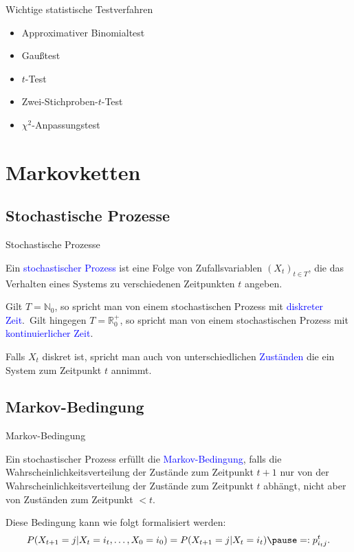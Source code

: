 \documentclass{beamer}
\def\spadding{\vspace{0.25cm}}
\def\b{\textcolor{blue}}
\begin{document}
\begin{frame}
    \begin{block}{Wichtige statistische Testverfahren}\pause
        \begin{itemize}
            \item Approximativer Binomialtest\pause
            \item Gaußtest\pause
            \item $t$-Test\pause
            \item Zwei-Stichproben-$t$-Test\pause
            \item $\chi^2$-Anpassungstest
        \end{itemize}
    \end{block}
\end{frame}

\section{Markovketten}
\subsection{Stochastische Prozesse}
\begin{frame}{Stochastische Prozesse}
    \begin{definition}
        Ein \b{stochastischer Prozess} ist eine Folge von Zufallsvariablen $(X_t)_{t \in T}$, die das Verhalten eines Systems zu verschiedenen Zeitpunkten $t$ angeben.\pause\par\spadding
        Gilt $T = \mathbb{N}_0$, so spricht man von einem stochastischen Prozess mit \b{diskreter Zeit}.\pause\ Gilt hingegen $T = \mathbb{R}_0^+$, so spricht man von einem stochastischen Prozess mit \b{kontinuierlicher Zeit}.\par
        Falls $X_t$ diskret ist, spricht man auch von unterschiedlichen \b{Zuständen} die ein System zum Zeitpunkt $t$ annimmt.
    \end{definition}
\end{frame}

\subsection{Markov-Bedingung}
\begin{frame}{Markov-Bedingung}
    \begin{definition}
        Ein stochastischer Prozess erfüllt die \b{Markov-Bedingung}, falls die Wahrscheinlichkeitsverteilung der Zustände zum Zeitpunkt $t + 1$ nur von der Wahrscheinlichkeitsverteilung der Zustände zum Zeitpunkt $t$ abhängt, nicht aber von Zuständen zum Zeitpunkt $< t$.\pause\par\spadding
        Diese Bedingung kann wie folgt formalisiert werden:
        \begin{align*}
            P(X_{t+1} = j | X_t = i_t, \dots, X_0 = i_0) = P(X_{t+1} = j | X_t = i_t)\pause =: p_{i_t j}^t.
        \end{align*}
    \end{definition}
\end{frame}
\end{document}
